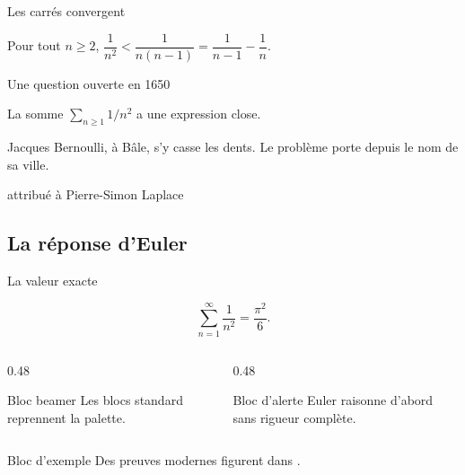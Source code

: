 \documentclass[nuit,charter,pied]{BeamerJS}
\begin{document}
\begin{frame}{Les carrés convergent}
	\begin{lemme}
		Pour tout $n\geq2$, $\dfrac{1}{n^2}<\dfrac{1}{n(n-1)}
		=\dfrac{1}{n-1}-\dfrac{1}{n}$.
	\end{lemme}


\end{frame}

\begin{frame}{Une question ouverte en 1650}
	\begin{conj}[Mengoli, 1650]
		La somme $\sum_{n\geq1}1/n^2$ a une expression close.
	\end{conj}

	Jacques Bernoulli, à Bâle, s'y casse les dents. Le problème porte depuis
	le nom de sa ville.

		{attribué à Pierre-Simon Laplace}
\end{frame}

\subsection{La réponse d'Euler}

\begin{frame}{La valeur exacte}
	\begin{thm}
		\[
			\sum_{n=1}^{\infty}\frac{1}{n^2}=\frac{\pi^2}{6}.
		\]
	\end{thm}

	\begin{columns}[T,onlytextwidth]
		\begin{column}{0.48\linewidth}
			\begin{block}{Bloc beamer}
				Les blocs standard reprennent la palette.
			\end{block}
		\end{column}
		\begin{column}{0.48\linewidth}
			\begin{alertblock}{Bloc d'alerte}
				Euler raisonne d'abord sans rigueur complète.
			\end{alertblock}
		\end{column}
	\end{columns}

	\begin{exampleblock}{Bloc d'exemple}
		Des preuves modernes figurent dans \cite{aigner2018}.
	\end{exampleblock}
\end{frame}
\end{document}
